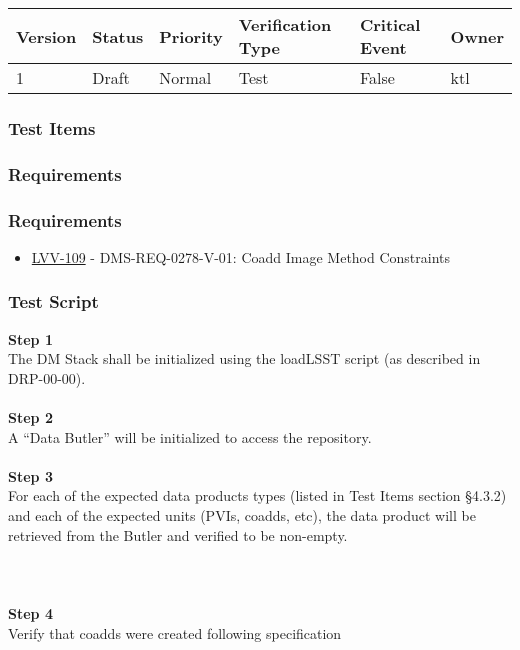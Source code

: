 \begin{longtable}[]{@{}llllll@{}}
\toprule
Version & Status & Priority & Verification Type & Critical Event &
Owner\tabularnewline
\midrule
\endhead
1 & Draft & Normal & Test & False & ktl\tabularnewline
\bottomrule
\end{longtable}

\hypertarget{test-items-2}{%
\subsubsection{Test Items}\label{test-items-2}}

\hypertarget{requirements-4}{%
\subsubsection{Requirements}\label{requirements-4}}

\hypertarget{requirements-5}{%
\subsubsection{Requirements}\label{requirements-5}}

\begin{itemize}
\tightlist
\item
  \href{https://jira.lsstcorp.org/browse/LVV-109}{LVV-109} -
  DMS-REQ-0278-V-01: Coadd Image Method Constraints
\end{itemize}

\hypertarget{test-script-2}{%
\subsubsection{Test Script}\label{test-script-2}}

\textbf{Step 1}\\
The DM Stack shall be initialized using the loadLSST script (as
described in DRP-00-00).\\
~\\
\textbf{Step 2}\\
A ``Data Butler'' will be initialized to access the repository.\\
~\\
\textbf{Step 3}\\
For each of the expected data products types (listed in Test Items
section §4.3.2) and each of the expected units (PVIs, coadds, etc), the
data product will be retrieved from the Butler and verified to be
non-empty.\\
~\\
~\\
~\\
\textbf{Step 4}\\
Verify that coadds were created following specification\\
~\\

